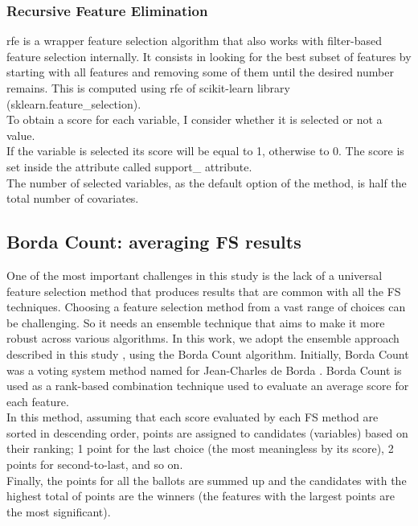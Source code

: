 \subsubsection{Recursive Feature Elimination}
\gls{rfe} is a wrapper feature selection algorithm that also works with filter-based feature selection internally.\newline
It consists in looking for the best subset of features by starting with all features and removing some of them until the desired number remains.\newline
This is computed using \acrshort{rfe} of scikit-learn library (sklearn.feature\_selection).\\
To obtain a score for each variable, I consider whether it is selected or not a value.\\
If the variable is selected its score will be equal to 1, otherwise to 0. The score is set inside the attribute called support\_ attribute.\\
The number of selected variables, as the default option of the method, is half the total number of covariates.
\pagebreak
\subsection{Borda Count: averaging FS results}
One of the most important challenges in this study is the lack of a universal feature selection method that produces results that are common with all the FS techniques. Choosing a feature selection method from a vast range of choices can be challenging. \newline
So it needs an ensemble technique that aims to make it more robust across various algorithms. In this work, we adopt the ensemble approach described in this study \cite{sarkar2014robust}, using the Borda Count algorithm. Initially, Borda Count was a voting system method named for Jean-Charles de Borda \cite{borda1784memoire}.\newline
Borda Count is used as a rank-based combination technique used to evaluate an average score for each feature. \\In this method, assuming that each score evaluated by each FS method are sorted in descending order, points are assigned to candidates (variables) based on their ranking; 1 point for the last choice (the most meaningless by its score), 2 points for second-to-last, and so on. \\Finally, the points for all the ballots are summed up and the candidates with the highest total of points are the winners (the features with the largest points are the most significant).
\bigskip
